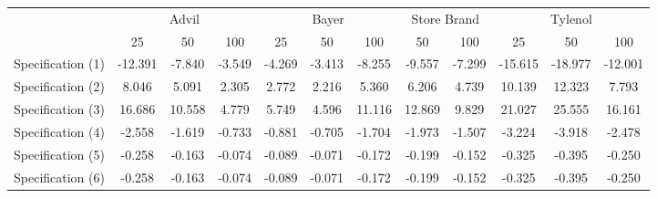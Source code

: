 {
\def\sym#1{\ifmmode^{#1}\else\(^{#1}\)\fi}
\begin{tabular}{l*{11}{c}}
\hline\hline
                    &\multicolumn{3}{c}{Advil}             &\multicolumn{3}{c}{Bayer}             &\multicolumn{2}{c}{Store Brand}&\multicolumn{3}{c}{Tylenol}           \\\cmidrule(lr){2-4}\cmidrule(lr){5-7}\cmidrule(lr){8-9}\cmidrule(lr){10-12}
                    &\multicolumn{1}{c}{25}&\multicolumn{1}{c}{50}&\multicolumn{1}{c}{100}&\multicolumn{1}{c}{25}&\multicolumn{1}{c}{50}&\multicolumn{1}{c}{100}&\multicolumn{1}{c}{50}&\multicolumn{1}{c}{100}&\multicolumn{1}{c}{25}&\multicolumn{1}{c}{50}&\multicolumn{1}{c}{100}\\
\hline
Specification (1)   &     -12.391&      -7.840&      -3.549&      -4.269&      -3.413&      -8.255&      -9.557&      -7.299&     -15.615&     -18.977&     -12.001\\
Specification (2)   &       8.046&       5.091&       2.305&       2.772&       2.216&       5.360&       6.206&       4.739&      10.139&      12.323&       7.793\\
Specification (3)   &      16.686&      10.558&       4.779&       5.749&       4.596&      11.116&      12.869&       9.829&      21.027&      25.555&      16.161\\
Specification (4)   &      -2.558&      -1.619&      -0.733&      -0.881&      -0.705&      -1.704&      -1.973&      -1.507&      -3.224&      -3.918&      -2.478\\
Specification (5)   &      -0.258&      -0.163&      -0.074&      -0.089&      -0.071&      -0.172&      -0.199&      -0.152&      -0.325&      -0.395&      -0.250\\
Specification (6)   &      -0.258&      -0.163&      -0.074&      -0.089&      -0.071&      -0.172&      -0.199&      -0.152&      -0.325&      -0.395&      -0.250\\
\hline\hline
\end{tabular}
}
